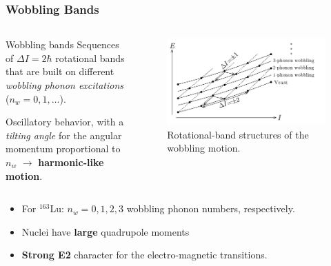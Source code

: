 \documentclass{beamer}
\begin{document}
\begin{frame}
  \frametitle{Wobbling Bands}
  
  \begin{columns} 
  \begin{block}{Wobbling bands}
    Sequences of $\Delta I=2\hbar$ rotational bands that are built on different \textit{wobbling phonon excitations} ($n_w=0,1,\dots$).

    Oscillatory behavior, with a \emph{tilting angle} for the angular momentum proportional to $n_w$ $\longrightarrow$ \textbf{harmonic-like motion}.
  \end{block}
  
  \begin{figure}
      \centering
      \includegraphics[scale=0.14]{figures/wobblingBands.png}
      \caption{Rotational-band structures of the wobbling motion.}
    \end{figure}
  \end{columns}
    \begin{itemize}
      \item For $^{163}$Lu: $n_w=0,1,2,3$ wobbling phonon numbers, respectively.
      \item Nuclei have \textbf{large} quadrupole moments
      \item \textbf{Strong E2} character for the electro-magnetic transitions.
    \end{itemize}

\end{frame}
\end{document}
